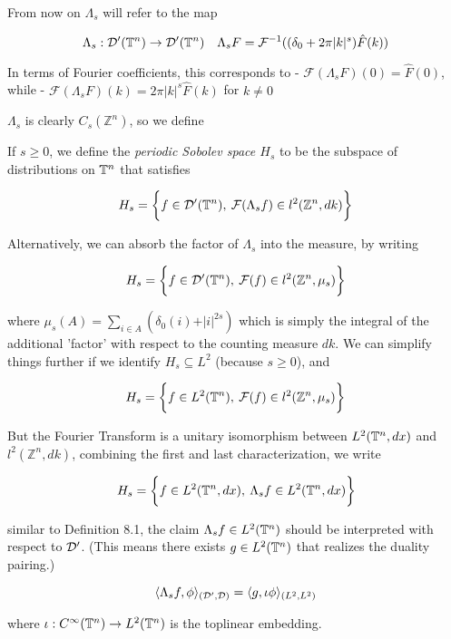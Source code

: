 \documentclass[../main-manifolds.tex]{subfiles}
\begin{document}
\begin{definition}
From now on $\Lambda_s$ will refer to the map

$$
\Lambda_s: \mathcal{D}'({\mathbb{T}^n})\to\mathcal{D}'({\mathbb{T}^n})\quad\Lambda_s F = \mathcal{F}^{-1}( (\delta_0 + 2\pi \vert k\vert^{s})\hat{F}(k))
$$

In terms of Fourier coefficients, this corresponds to 
- $\mathcal{F}(\Lambda_s F)(0) = \hat{F}(0)$, while 
- $\mathcal{F}(\Lambda_s F)(k) = 2\pi\vert k\vert^{s}\hat{F}(k)$ for $k\neq 0$
    
\end{definition}

$\Lambda_s$ is clearly $C_s(\mathbb{Z}^n)$, so we define
\begin{definition}
If $s\geq 0$, we define the \emph{periodic Sobolev space $H_s$} to be the subspace of distributions on ${\mathbb{T}^n}$ that satisfies 

$$
H_s = \biggl\{{f\in \mathcal{D}'({\mathbb{T}^n}),\: \mathcal{F}(\Lambda_s f)\in l^2(\mathbb{Z}^n,dk)}\biggr\}
$$

Alternatively, we can absorb the factor of $\Lambda_s$ into the measure, by writing 

$$
H_s = \biggl\{{f\in\mathcal{D}'({\mathbb{T}^n}),\: \mathcal{F}(f)\in l^2(\mathbb{Z}^n,\mu_s)}\biggr\}
$$

where $\mu_s(A) = \sum_{i\in A}(\delta_0(i) + \vert i\vert^{2s})$ which is simply the integral of the additional 'factor' with respect to the counting measure $dk$. We can simplify things further if we identify $H_s\subseteq L^2$ (because $s\geq 0$), and

$$
H_s = \biggl\{{f\in L^2({\mathbb{T}^n}),\: \mathcal{F}(f)\in l^2(\mathbb{Z}^n, \mu_s)}\biggr\}
$$

But the Fourier Transform is a unitary isomorphism between $L^2({\mathbb{T}^n},dx)$ and $l^2(\mathbb{Z}^n,dk)$, combining the first and last characterization, we write

$$
H_s = \biggl\{{f\in L^2({\mathbb{T}^n},dx),\: \Lambda_sf\in L^2({\mathbb{T}^n},dx)}\biggr\}
$$

similar to Definition 8.1, the claim $\Lambda_s f\in L^2({\mathbb{T}^n})$ should be interpreted with respect to $\mathcal{D}'$. (This means there exists $g\in L^2({\mathbb{T}^n})$ that realizes the duality pairing.)

$$
\langle \Lambda_s f,\phi\rangle_{(\mathcal{D}',\mathcal{D})}=\langle g,\iota\phi\rangle_{(L^2,L^2)}
$$

where $\iota:C^\infty({\mathbb{T}^n})\to L^2({\mathbb{T}^n})$ is the toplinear embedding.    
\end{definition}
\end{document}
